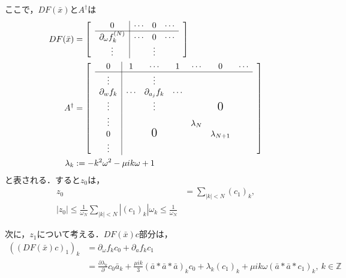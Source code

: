 \documentclass[11pt,a4paper,titlepage]{jsreport}
\theoremstyle{definition}
\begin{document}
ここで，$DF(\bar{x})とA^\dagger$は
\begin{align*}
  DF(\bar{x}) & = \begin{bmatrix}
                     & \multicolumn{0}{c|}{0}                         & \cdots & 0      & \cdots & \\ \cline{2-5}
                     & \multicolumn{1}{c|}{\partial_\omega f_k^{(N)}} & \cdots & 0      & \cdots & \\
                     & \multicolumn{1}{c|}{\vdots}                    &        & \vdots &        &
                  \end{bmatrix}                                         \\
  A^\dagger   & = \begin{bmatrix}
                     & \multicolumn{1}{c|}{0}              & 1      & \cdots            & 1      & \cdots    & 0                & \cdots & \\ \cline{2-8}
                     & \multicolumn{1}{c|}{\vdots}         &        & \vdots            &        &           &                  &        & \\
                     & \multicolumn{1}{c|}{\partial_w f_k} & \cdots & \partial_{a_j}f_k & \cdots &           &                  &          \\
                     & \multicolumn{1}{c|}{\vdots}         &        & \vdots            &        &           & \text{\Large{0}} &          \\
                     & \multicolumn{1}{c|}{\vdots}         &        &                   &        & \lambda_N &                  &        & \\
                     & \multicolumn{1}{c|}{0}              &        & \text{\Large{0}}  &        &           & \lambda_{N+1}    &          \\
                     & \multicolumn{1}{c|}{\vdots}         &        &                   &        &           &                  &
                  \end{bmatrix} \\
  \lambda_k   & := -k^2\omega^2 - \mu ik\omega + 1
\end{align*}
と表される．すると$z_0$は，
\begin{align*}
  z_0 & = \sum_{|k|<N} (c_1)_k, \\
  |z_0| \leq \frac{1}{\omega_N} \sum_{|k|<N} |(c_1)_k| \omega_k \leq \frac{1}{\omega_N}
\end{align*}

次に，$z_1$について考える．$DF(\bar{x})c$部分は，
\begin{equation*}
  \begin{split}
    \left(\left(DF(\bar{x})c\right)_1 \right)_k &= \partial_\omega f_k c_0 + \partial_a f_k c_1 \\
    &= \frac{\partial \lambda_k}{\partial} c_0 \bar{a}_k + \frac{\mu ik}{3} \left( \bar{a} * \bar{a} * \bar{a} \right)_k c_0 + \lambda_k (c_1)_k + \mu ik \omega \left( \bar{a} * \bar{a} * c_1 \right)_k,\ k \in \mathbb{Z}
  \end{split}
\end{equation*}
\end{document}
